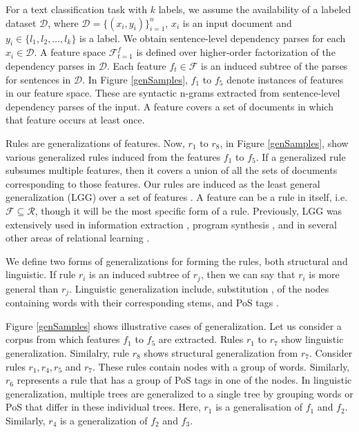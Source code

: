 For a text classification task with $k$ labels, we assume the  availability of a labeled dataset $\mathcal{D}$,  where $\mathcal{D} = \{(x_i,y_i)\}_{i=1}^{n}$, $x_i$ is an input document and $y_i \in \{l_1,l_2,...,l_k\}$ is a label. We obtain sentence-level dependency parses for each $x_i \in \mathcal{D}$. A feature space $\mathcal{F}_{t=1}^{f}$ is defined over higher-order factorization of the dependency parses in $\mathcal{D}$. Each feature $f_t \in \mathcal{F}$ is an induced subtree of the parses for sentences in $\mathcal{D}$. In Figure \ref{genSamples}, $f_1$ to $f_5$ denote instances of features in our feature space. These are syntactic n-grams extracted from  sentence-level dependency parses of the input. A feature covers a set of documents in which that feature occurs at least once.





Rules are generalizations of features. Now, $r_1$ to $r_8$, in Figure \ref{genSamples}, show various generalized rules induced from the features $f_1$ to $f_5$. If a generalized rule subsumes multiple features, then it covers a union of all the sets of documents corresponding to those features.   Our rules are induced as the least general generalization (LGG) over a set of features \cite{plotkinnote,plotkin1971further}. A feature can be a rule in itself, i.e. $\mathcal{F} \subseteq \mathcal{R}$, though it will be the most specific form of a rule. Previously, LGG was extensively used in information extraction \cite{califf-mooney-1997-relational,nagesh-etal-2012-towards}, program synthesis \cite{Raza_Gulwani_Milic-Frayling_2014,kitzelmann2010combined}, and in several other areas of relational learning \cite{muggleton1992efficient,zelle1994combining}.  %

We define two forms of generalizations for forming the rules, both structural and linguistic. If rule $r_i$ is an induced subtree of $r_j$, then we can say that $r_i$ is more general than  $r_j$. Linguistic generalization include, substitution \cite{Raza_Gulwani_Milic-Frayling_2014,thakoor2018multisynthesis}, of the nodes containing words with their corresponding stems, and PoS tags \cite{galitsky2019least}. 

Figure \ref{genSamples} shows illustrative cases of generalization.  Let us consider a corpus from which features $f_1$ to $f_5$ are extracted.  Rules $r_1$ to $r_7$ show linguistic generalization. Similalry, rule $r_8$ shows structural generalization from $r_7$. Consider rules $r_1, r_4, r_5$ and $r_7$.  These rules contain nodes with a group of words. Similarly, $r_6$ represents a rule that has a group of PoS tags in one of the nodes. In linguistic generalization, multiple trees are generalized to a single tree by grouping words or PoS that differ in these individual trees. Here, $r_1$ is a generalisation of $f_1$ and $f_2$. Similarly, $r_4$ is a generalization of $f_2$ and $f_3$. 



